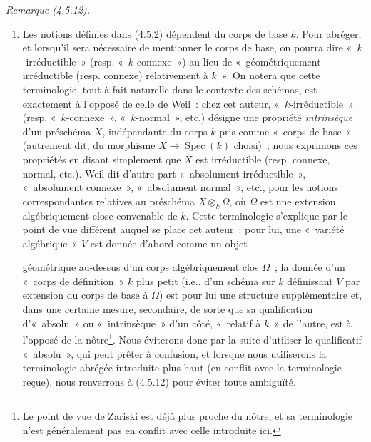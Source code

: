 \documentclass[10pt,oneside]{book}
\newcommand{\oldpage}[2][]{%
  \setcounter{footnote}{0}%
  \marginpar{\scriptsize\textbf{#1}~|~#2}\ignorespaces}
\newenvironment{remark}[1][]{%
  \par\medskip\noindent\itshape Remarque (#1). ---\ }{\par}
\begin{document}
\begin{remark}[4.5.12]
\label{IV.2.4.5.12-fr}
\begin{enumerate}
\item[(i)] Les notions définies dans (4.5.2) dépendent du corps de base $k$.
Pour abréger, et lorsqu'il sera nécessaire de mentionner le corps de base, on
pourra dire «~$k$-irréductible~» (resp. «~$k$-connexe~») au lieu de
«~géométriquement irréductible (resp. connexe) relativement à $k$~». On notera
que cette terminologie, tout à fait naturelle dans le contexte des schémas,
est exactement à l'opposé de celle de Weil~: chez cet auteur,
«~$k$-irréductible~» (resp. «~$k$-connexe~», «~$k$-normal~», etc.) désigne une
propriété \emph{intrinsèque} d'un préschéma $X$, indépendante du corps $k$ pris
comme «~corps de base~» (autrement dit, du morphisme
$X\to\operatorname{Spec}(k)$ choisi)~; nous exprimons ces propriétés en disant
simplement que $X$ est irréductible (resp. connexe, normal, etc.). Weil dit
d'autre part «~absolument irréductible~», «~absolument connexe~», «~absolument
normal~», etc., pour les notions correspondantes relatives au préschéma
$X\otimes_k\Omega$, où $\Omega$ est une extension algébriquement close
convenable de $k$. Cette terminologie s'explique par le point de vue différent
auquel se place cet auteur~: pour lui, une «~variété algébrique~» $V$ est
donnée d'abord comme un objet

\oldpage[IV-2]{64}

géométrique au-dessus d'un corps algébriquement clos $\Omega$~; la donnée d'un
«~corps de définition~» $k$ plus petit (i.e., d'un schéma sur $k$ définissant
$V$ par extension du corps de base à $\Omega$) est pour lui une structure
supplémentaire et, dans une certaine mesure, secondaire, de sorte que sa
qualification d'«~absolu~» ou «~intrinsèque~» d'un côté, «~relatif à $k$~» de
l'autre, est à l'opposé de la nôtre\footnote{Le point de vue de Zariski est
déjà plus proche du nôtre, et sa terminologie n'est généralement pas en conflit
avec celle introduite ici.}. Nous éviterons donc par la suite d'utiliser le
qualificatif «~absolu~», qui peut prêter à confusion, et lorsque nous
utiliserons la terminologie abrégée introduite plus haut (en conflit avec la
terminologie reçue), nous renverrons à (4.5.12) pour éviter toute ambiguïté.


\end{enumerate}
\end{remark}
\end{document}

